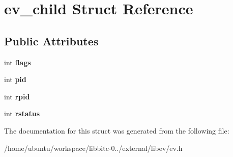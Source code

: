 \hypertarget{structev__child}{\section{ev\-\_\-child Struct Reference}
\label{structev__child}
}
\subsection*{Public Attributes}
\begin{DoxyCompactItemize}
\item 
\hypertarget{structev__child_adc0be0861d839044ff2791879d23b9da}{int {\bfseries flags}}\label{structev__child_adc0be0861d839044ff2791879d23b9da}

\item 
\hypertarget{structev__child_aabe34b18e3fd1e6ad14a24e5c0e5ba13}{int {\bfseries pid}}\label{structev__child_aabe34b18e3fd1e6ad14a24e5c0e5ba13}

\item 
\hypertarget{structev__child_affe3dced46abf3638cf24b576c07c955}{int {\bfseries rpid}}\label{structev__child_affe3dced46abf3638cf24b576c07c955}

\item 
\hypertarget{structev__child_aac9c76006b1e0139dabae9a13775e775}{int {\bfseries rstatus}}\label{structev__child_aac9c76006b1e0139dabae9a13775e775}

\end{DoxyCompactItemize}


The documentation for this struct was generated from the following file\-:\begin{DoxyCompactItemize}
\item 
/home/ubuntu/workspace/libbitc-\/0../external/libev/ev.\-h\end{DoxyCompactItemize}
